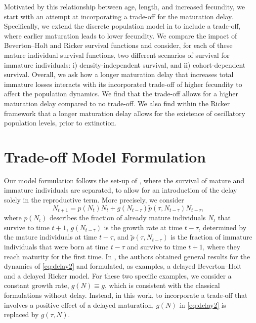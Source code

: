 \documentclass{article}
\numberwithin{theorem}{section}
\begin{document}
Motivated by this relationship between  age, length, and increased fecundity, we start with an attempt at incorporating a trade-off for the maturation delay. Specifically, we extend the discrete population model in \cite{StWodelay2} to include a trade-off, where earlier maturation leads to lower fecundity. We compare the impact of Beverton--Holt and Ricker survival functions and consider, for each of these mature individual survival functions, two different scenarios of survival for immature individuals: i) density-independent survival, and ii) cohort-dependent survival. Overall, we ask how a longer maturation delay that increases total immature losses interacts with its incorporated trade-off of higher fecundity to affect the population dynamics. We find that the trade-off allows for a higher maturation delay compared to no trade-off. We also find within the Ricker framework that a longer maturation delay allows for the existence of oscillatory population levels, prior to extinction. 

\section{Trade-off Model Formulation} 

Our model formulation follows the set-up of \cite{StWodelay2}, where the survival of mature and immature individuals are separated, to allow for an introduction of the delay solely in the reproductive term. More precisely, we consider
\begin{equation}\label{eq:delay2}
    N_{t+1}=p(N_t)N_t + g(N_{t-\tau})\tilde{p}(\tau,N_{t-\tau})N_{t-\tau},
\end{equation}
where $p(N_t)$ describes the fraction of already mature individuals $N_t$ that survive to time $t+1$, $g(N_{t-\tau})$ is the growth rate at time $t-\tau$, determined by the mature individuals at time $t-\tau$, and $\tilde{p}(\tau,N_{t-\tau})$ is the fraction of immature individuals that were born at time $t-\tau$ and survive to time $t+1$, where they reach maturity for the first time. In \cite{StWodelay2}, the authors obtained general results for the dynamics of \eqref{eq:delay2} and formulated, as examples, a delayed Beverton--Holt and a delayed Ricker model. 
For these two specific examples, we consider a constant growth rate, $g(N)\equiv g$, which is consistent with the classical formulations without delay. Instead, in this work, to incorporate a trade-off that involves  a positive effect of a delayed maturation,  $g(N)$ in \eqref{eq:delay2} is replaced by $g(\tau, N)$.
\end{document}
